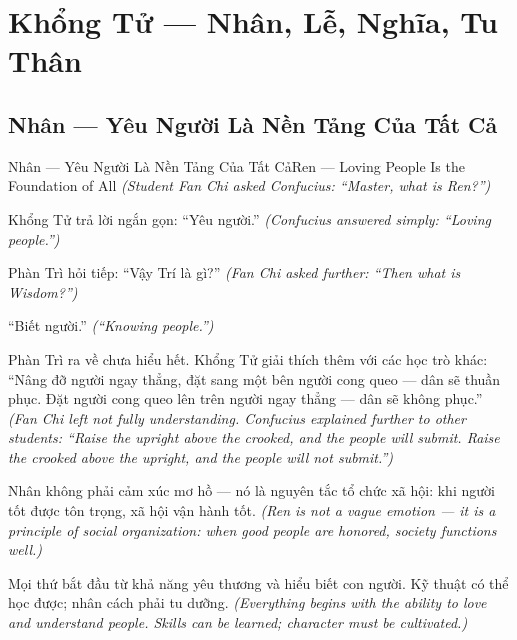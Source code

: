 \chapter{Khổng Tử — Nhân, Lễ, Nghĩa, Tu Thân}

\section{Nhân — Yêu Người Là Nền Tảng Của Tất Cả}
\begin{truyen}{Nhân — Yêu Người Là Nền Tảng Của Tất Cả}{Ren — Loving People Is the Foundation of All}
\textit{(Student Fan Chi asked Confucius: ``Master, what is Ren?'')}

Khổng Tử trả lời ngắn gọn: ``Yêu người.''
\textit{(Confucius answered simply: ``Loving people.'')}

Phàn Trì hỏi tiếp: ``Vậy Trí là gì?''
\textit{(Fan Chi asked further: ``Then what is Wisdom?'')}

``Biết người.''
\textit{(``Knowing people.'')}

Phàn Trì ra về chưa hiểu hết. Khổng Tử giải thích thêm với các học trò khác: ``Nâng đỡ người ngay thẳng, đặt sang một bên người cong queo — dân sẽ thuần phục. Đặt người cong queo lên trên người ngay thẳng — dân sẽ không phục.''
\textit{(Fan Chi left not fully understanding. Confucius explained further to other students: ``Raise the upright above the crooked, and the people will submit. Raise the crooked above the upright, and the people will not submit.'')}

Nhân không phải cảm xúc mơ hồ — nó là nguyên tắc tổ chức xã hội: khi người tốt được tôn trọng, xã hội vận hành tốt.
\textit{(Ren is not a vague emotion — it is a principle of social organization: when good people are honored, society functions well.)}

\end{truyen}

\begin{baihoc}
Mọi thứ bắt đầu từ khả năng yêu thương và hiểu biết con người. Kỹ thuật có thể học được; nhân cách phải tu dưỡng.
\textit{(Everything begins with the ability to love and understand people. Skills can be learned; character must be cultivated.)}
\end{baihoc}
\ngancach

